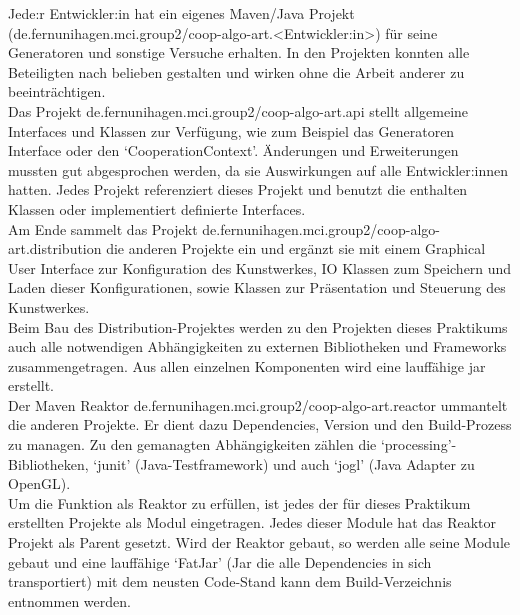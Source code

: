 \documentclass[../mciAusarbeitung.tex]{subfiles}
\begin{document}
	Jede:r Entwickler:in hat ein eigenes Maven/Java Projekt (de.fernunihagen.mci.group2/coop-algo-art.<Entwickler:in>) für seine Generatoren und sonstige Versuche erhalten. In den Projekten konnten alle Beteiligten nach belieben gestalten und wirken ohne die Arbeit anderer zu beeinträchtigen.\\
	Das Projekt de.fernunihagen.mci.group2/coop-algo-art.api stellt allgemeine Interfaces und Klassen zur Verfügung, wie zum Beispiel das Generatoren Interface oder den `CooperationContext'. Änderungen und Erweiterungen mussten gut abgesprochen werden, da sie Auswirkungen auf alle Entwickler:innen hatten. Jedes Projekt referenziert dieses Projekt und benutzt die enthalten Klassen oder implementiert definierte Interfaces.\\
	Am Ende sammelt das Projekt de.fernunihagen.mci.group2/coop-algo-art.distribution die anderen Projekte ein und ergänzt sie mit einem Graphical User Interface zur Konfiguration des Kunstwerkes, IO Klassen zum Speichern und Laden dieser Konfigurationen, sowie Klassen zur Präsentation und Steuerung des Kunstwerkes. \\
	Beim Bau des Distribution-Projektes werden zu den Projekten dieses Praktikums auch alle notwendigen Abhängigkeiten zu externen Bibliotheken und Frameworks zusammengetragen. Aus allen einzelnen Komponenten wird eine lauffähige jar erstellt.\\
	Der Maven Reaktor de.fernunihagen.mci.group2/coop-algo-art.reactor ummantelt die anderen Projekte. Er dient dazu Dependencies, Version und den Build-Prozess zu managen. Zu den gemanagten Abhängigkeiten zählen die `processing'-Bibliotheken, `junit' (Java-Testframework) und auch `jogl' (Java Adapter zu OpenGL). \\
	Um die Funktion als Reaktor zu erfüllen, ist jedes der für dieses Praktikum erstellten Projekte als Modul eingetragen. Jedes dieser Module hat das Reaktor Projekt als Parent gesetzt. Wird der Reaktor gebaut, so werden alle seine Module gebaut und eine lauffähige `FatJar' (Jar die alle Dependencies in sich transportiert) mit dem neusten Code-Stand kann dem Build-Verzeichnis entnommen werden.
	
\end{document}
